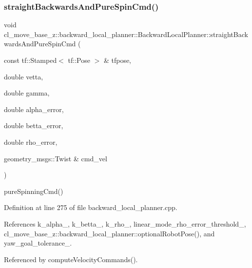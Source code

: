\subsubsection{\texorpdfstring{straight\+Backwards\+And\+Pure\+Spin\+Cmd()}{straightBackwardsAndPureSpinCmd()}}
{\footnotesize\ttfamily void cl\+\_\+move\+\_\+base\+\_\+z\+::backward\+\_\+local\+\_\+planner\+::\+Backward\+Local\+Planner\+::straight\+Backwards\+And\+Pure\+Spin\+Cmd (\begin{DoxyParamCaption}\item[{const tf\+::\+Stamped$<$ tf\+::\+Pose $>$ \&}]{tfpose,  }\item[{double}]{vetta,  }\item[{double}]{gamma,  }\item[{double}]{alpha\+\_\+error,  }\item[{double}]{betta\+\_\+error,  }\item[{double}]{rho\+\_\+error,  }\item[{geometry\+\_\+msgs\+::\+Twist \&}]{cmd\+\_\+vel }\end{DoxyParamCaption})\hspace{0.3cm}{\ttfamily [private]}}

pure\+Spinning\+Cmd() 

Definition at line 275 of file backward\+\_\+local\+\_\+planner.\+cpp.



References k\+\_\+alpha\+\_\+, k\+\_\+betta\+\_\+, k\+\_\+rho\+\_\+, linear\+\_\+mode\+\_\+rho\+\_\+error\+\_\+threshold\+\_\+, cl\+\_\+move\+\_\+base\+\_\+z\+::backward\+\_\+local\+\_\+planner\+::optional\+Robot\+Pose(), and yaw\+\_\+goal\+\_\+tolerance\+\_\+.



Referenced by compute\+Velocity\+Commands().


